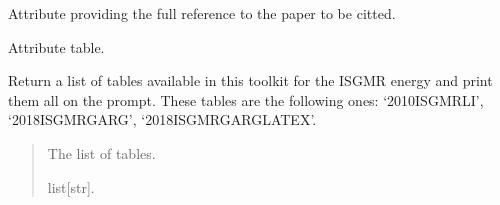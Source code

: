 \documentclass[letterpaper,10pt,english]{sphinxmanual}
\begin{document}
\begin{fulllineitems}
\begin{fulllineitems}
\end{fulllineitems}


\begin{fulllineitems}
\label{\detokenize{source/api/setup_ISGMR:nucleardatapy.setup_ISGMR.SetupISGMR.ref}}
\pysigstartsignatures
{}
\pysigstopsignatures
\sphinxAtStartPar
Attribute providing the full reference to the paper to be citted.

\end{fulllineitems}


\begin{fulllineitems}
\label{\detokenize{source/api/setup_ISGMR:nucleardatapy.setup_ISGMR.SetupISGMR.table}}
\pysigstartsignatures
{}
\pysigstopsignatures
\sphinxAtStartPar
Attribute table.

\end{fulllineitems}


\end{fulllineitems}


\begin{fulllineitems}
\label{\detokenize{source/api/setup_ISGMR:nucleardatapy.setup_ISGMR.tables_isgmr}}
\pysigstartsignatures
{}
\pysigstopsignatures
\sphinxAtStartPar
Return a list of tables available in this toolkit for the ISGMR energy and
print them all on the prompt. These tables are the following
ones: ‘2010\sphinxhyphen{}ISGMR\sphinxhyphen{}LI’, ‘2018\sphinxhyphen{}ISGMR\sphinxhyphen{}GARG’, ‘2018\sphinxhyphen{}ISGMR\sphinxhyphen{}GARG\sphinxhyphen{}LATEX’.
\begin{quote}\begin{description}
\sphinxAtStartPar
The list of tables.

\sphinxAtStartPar
list{[}str{]}.

\end{description}\end{quote}

\end{fulllineitems}
\end{document}
